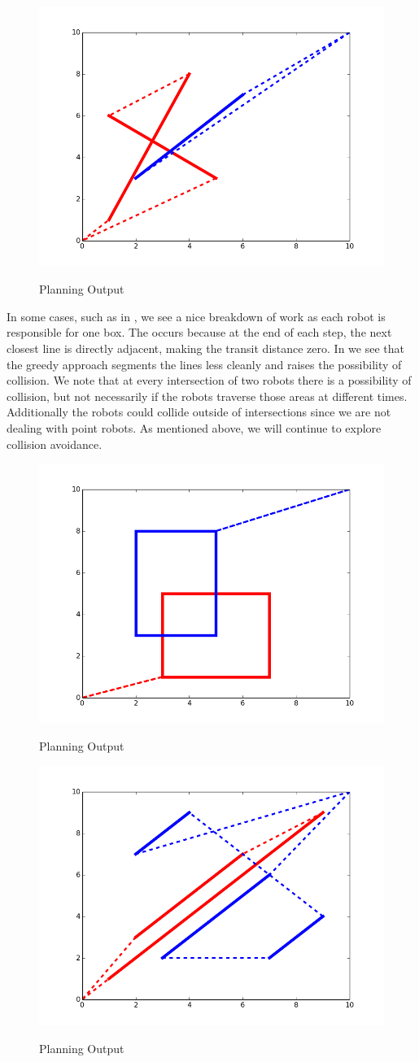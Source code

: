 \begin{figure}[h!]
\centering
\includegraphics[width=0.49\columnwidth]{figs/figure_1.png}
\label{fig:planner1}
\caption{Planning Output}
\end{figure}

In some cases, such as in , we see a nice breakdown of work as each robot is responsible for one box. The occurs because at the end of each step, the next closest line is directly adjacent, making the transit distance zero. In  we see that the greedy approach segments the lines less cleanly and raises the possibility of collision. We note that at every intersection of two robots there is a possibility of collision, but not necessarily if the robots traverse those areas at different times. Additionally the robots could collide outside of intersections since we are not dealing with point robots. As mentioned above, we will continue to explore collision avoidance. 

\begin{figure}[h!]
\centering
\includegraphics[width=0.49\columnwidth]{figs/figure_7.png}
\label{fig:planner2}
\caption{Planning Output}
\end{figure}

\begin{figure}[h!]
\centering
\includegraphics[width=0.49\columnwidth]{figs/figure_4.png}
\label{fig:planner3}
\caption{Planning Output}
\end{figure}
